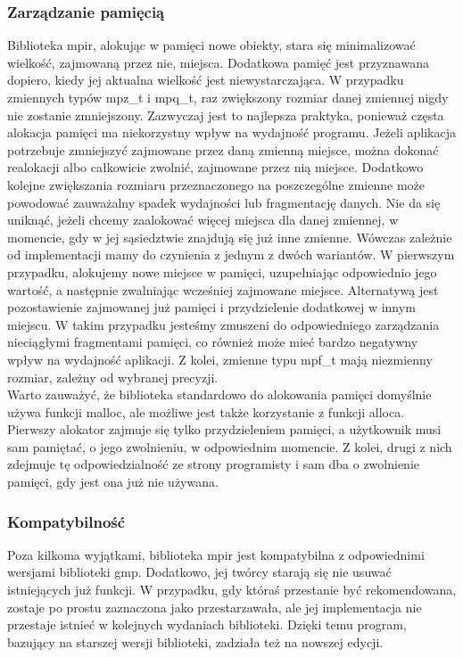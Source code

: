 \documentclass[twoside,a4paper]{book}
\begin{document}
\subsubsection{Zarządzanie pamięcią}
Biblioteka mpir, alokując w pamięci nowe obiekty, stara się minimalizować wielkość, zajmowaną przez nie, miejsca. Dodatkowa pamięć jest przyznawana dopiero, kiedy jej aktualna wielkość jest niewystarczająca. W przypadku zmiennych typów mpz\_t i mpq\_t, raz zwiększony rozmiar danej zmiennej nigdy nie zostanie zmniejszony. Zazwyczaj jest to najlepsza praktyka, ponieważ częsta alokacja pamięci ma niekorzystny wpływ na wydajność programu. Jeżeli aplikacja potrzebuje zmniejszyć zajmowane przez daną zmienną miejsce, można dokonać realokacji albo całkowicie zwolnić, zajmowane przez nią miejsce. Dodatkowo kolejne zwiększania rozmiaru przeznaczonego na poszczególne zmienne może powodować zauważalny spadek wydajności lub fragmentację danych. Nie da się uniknąć, jeżeli chcemy zaalokować więcej miejsca dla danej zmiennej, w momencie, gdy w jej sąsiedztwie znajdują się już inne zmienne. Wówczas zależnie od implementacji mamy do czynienia z jednym z dwóch wariantów. W pierwszym przypadku, alokujemy nowe miejsce w pamięci, uzupełniając odpowiednio jego wartość, a następnie zwalniając wcześniej zajmowane miejsce. Alternatywą jest pozostawienie zajmowanej już pamięci i przydzielenie dodatkowej w innym miejscu. W takim przypadku jesteśmy zmuszeni do odpowiedniego zarządzania nieciągłymi fragmentami pamięci, co również może mieć bardzo negatywny wpływ na wydajność aplikacji. Z kolei, zmienne typu mpf\_t mają niezmienny rozmiar, zależny od wybranej precyzji. \\
Warto zauważyć, że biblioteka standardowo do alokowania pamięci domyślnie używa funkcji malloc, ale możliwe jest także korzystanie z funkcji alloca. Pierwszy alokator zajmuje się tylko przydzieleniem pamięci, a użytkownik musi sam pamiętać, o jego zwolnieniu, w odpowiednim momencie. Z kolei, drugi z nich zdejmuje tę odpowiedzialność ze strony programisty i sam dba o zwolnienie pamięci, gdy jest ona już nie używana.

\subsubsection{Kompatybilność}
Poza kilkoma wyjątkami, biblioteka mpir jest kompatybilna z odpowiednimi wersjami biblioteki gmp. Dodatkowo, jej twórcy starają się nie usuwać istniejących już funkcji. W przypadku, gdy któraś przestanie być rekomendowana, zostaje po prostu zaznaczona jako przestarzawała, ale jej implementacja nie przestaje istnieć w kolejnych wydaniach biblioteki. Dzięki temu program, bazujący na starszej wersji biblioteki, zadziała też na nowszej edycji.
\end{document}
